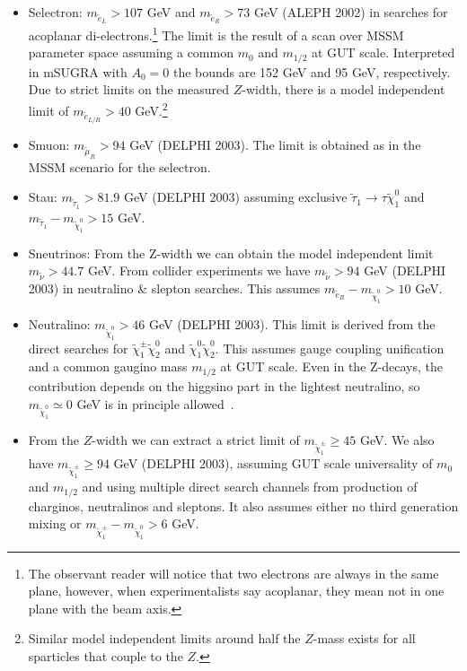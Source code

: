 \documentclass[notes.tex]{subfiles}
\begin{document}
\begin{itemize}
\item Selectron: $m_{\tilde{e}_L}>107$ GeV and $m_{\tilde{e}_R}>73$ GeV (ALEPH 2002) in searches for acoplanar di-electrons.\footnote{The observant reader will notice that two electrons are always in the same plane, however, when experimentalists say acoplanar, they mean not in one plane with the beam axis.} The limit is the result of a scan over MSSM parameter space assuming a common $m_0$ and $m_{1/2}$ at GUT scale. Interpreted in mSUGRA with $A_0=0$ the bounds are 152 GeV and 95 GeV, respectively. Due to strict limits on the measured $Z$-width, there is a model independent limit of $m_{\tilde{e}_{L/R}}>40$ GeV.\footnote{Similar model independent limits around half the $Z$-mass exists for all sparticles that couple to the $Z$.}
\item Smuon: $m_{\tilde{\mu}_R}>94$ GeV (DELPHI 2003). The limit is obtained as in the MSSM scenario for the selectron.
\item Stau: $m_{\tilde{\tau}_1}>81.9$ GeV (DELPHI 2003) assuming exclusive $\tilde{\tau}_1 \to \tau \tilde{\chi}^0_1$ and $m_{\tilde{\tau}_1} - m_{\tilde{\chi}^0_1}> 15$ GeV.
\item Sneutrinos: From the Z-width we can obtain the model independent limit $m_{\tilde{\nu}}> 44.7$ GeV. From collider experiments we have $m_{\tilde{\nu}}>94$ GeV (DELPHI 2003) in neutralino \& slepton searches. This assumes $m_{\tilde{e}_R} - m_{\tilde{\chi}^0_1}>10$ GeV.
\item Neutralino: $m_{\tilde{\chi}^0_1}> 46$ GeV (DELPHI 2003). This limit is derived from the direct searches for $\tilde{\chi}^\pm_1 \tilde{\chi}^0_2$ and $\tilde{\chi}^0_1 \tilde{\chi}^0_2$. This assumes gauge coupling unification and a common gaugino mass $m_{1/2}$ at GUT scale. Even in the Z-decays, the contribution depends on the higgsino part in the lightest neutralino, so $m_{\tilde{\chi}^0_1} \simeq 0$ GeV is in principle allowed~\cite{Dreiner:2009ic}.
\item From the $Z$-width we can extract a strict limit of $m_{\tilde{\chi}^\pm_1}\geq 45$ GeV.
We also have $m_{\tilde{\chi}^\pm_1}\geq 94$ GeV (DELPHI 2003), assuming GUT scale universality of $m_0$ and $m_{1/2}$ and using multiple direct search channels from production of charginos, neutralinos and sleptons. It also assumes either no third generation mixing or $m_{\tilde{\chi}^\pm_1} - m_{\tilde{\chi}^0_1}>6$ GeV. 
\end{itemize}
\end{document}
